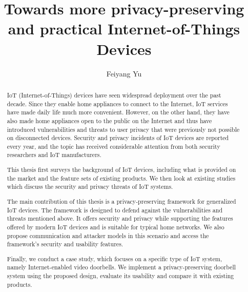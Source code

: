 \documentclass[12pt]{report}
\title{Towards more privacy-preserving and practical Internet-of-Things Devices}
\author{Feiyang Yu}
\begin{document}

\maketitle    %

\begin{abstract}

IoT (Internet-of-Things) devices have seen widespread deployment over the past decade. Since they enable home appliances to connect to the Internet, IoT services have made daily life much more convenient. However, on the other hand, they have also made home appliances open to the public on the Internet and thus have introduced vulnerabilities and threats to user privacy that were previously not possible on disconnected devices. Security and privacy incidents of IoT devices are reported every year, and the topic has received considerable attention from both security researchers and IoT manufacturers.

This thesis first surveys the background of IoT devices, including what is provided on the market and the feature sets of existing products. We then look at existing studies which discuss the security and privacy threats of IoT systems.

The main contribution of this thesis is a privacy-preserving framework for generalized IoT devices. The framework is designed to defend against the vulnerabilities and threats mentioned above. It offers security and privacy while supporting the features offered by modern IoT devices and is suitable for typical home networks. We also propose communication and attacker models in this scenario and access the framework's security and usability features.

Finally, we conduct a case study, which focuses on a specific type of IoT system, namely Internet-enabled video doorbells. We implement a privacy-preserving doorbell system using the proposed design, evaluate its usability and compare it with existing products.

\end{abstract}





\end{document}
